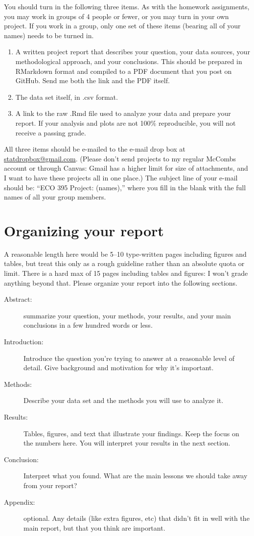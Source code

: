 \documentclass{mynotes}
\begin{document}
You should turn in the following three items.  As with the homework assignments, you may work in groups of 4 people or fewer, or you may turn in your own project.  If you work in a group, only one set of these items (bearing all of your names) needs to be turned in.
\begin{enumerate}
\item A written project report that describes your question, your data sources, your methodological approach, and your conclusions.  This should be prepared in RMarkdown format and compiled to a PDF document that you post on GitHub.  Send me both the link and the PDF itself.    
\item The data set itself, in .csv format.
\item A link to the raw .Rmd file used to analyze your data and prepare your report.  If your analysis and plots are not 100$\%$ reproducible, you will not receive a passing grade.
\end{enumerate}
All three items should be e-mailed to the e-mail drop box at \url{statdropbox@gmail.com}.  (Please don't send projects to my regular McCombs account or through Canvas: Gmail has a higher limit for size of attachments, and I want to have these projects all in one place.)  The subject line of your e-mail should be: ``ECO 395 Project: (names),'' where you fill in the blank with the full names of all your group members.


\section{Organizing your report}

A reasonable length here would be 5--10 type-written pages including figures and tables, but treat this only as a rough guideline rather than an absolute quota or limit.  There is a hard max of 15 pages including tables and figures: I won't grade anything beyond that.  Please organize your report into the following sections.
\begin{description}
\item[Abstract:] summarize your question, your methods, your results, and your main conclusions in a few hundred words or less.
\item[Introduction:] Introduce the question you're trying to answer at a reasonable level of detail.  Give background and motivation for why it's important.
\item[Methods:] Describe your data set and the methods you will use to analyze it.
\item[Results:] Tables, figures, and text that illustrate your findings.  Keep the focus on the numbers here.  You will interpret your results in the next section.
\item[Conclusion:] Interpret what you found. What are the main lessons we should take away from your report?
\item[Appendix:] optional.  Any details (like extra figures, etc) that didn't fit in well with the main report, but that you think are important.
\end{description}
\end{document}
